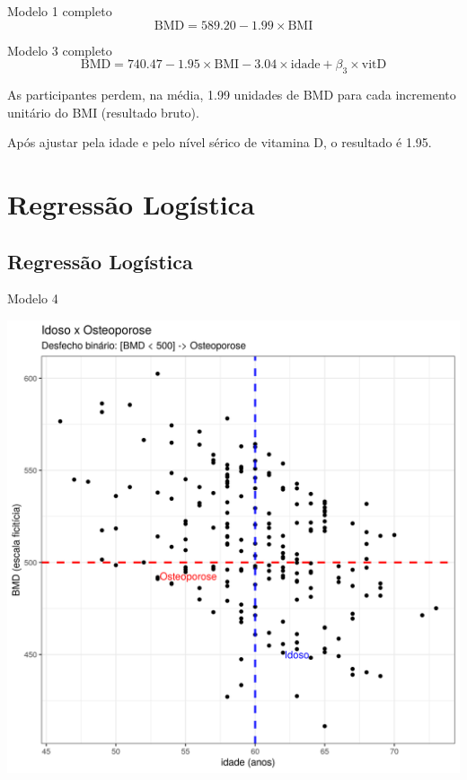 \documentclass{beamer}
\begin{document}
\begin{frame}{\scriptsize }
  \begin{exampleblock}{Modelo 1 completo}
    \tiny
    \begin{displaymath}
      \text{BMD} =589.20 -1.99 \times\text{BMI}
    \end{displaymath}
  \end{exampleblock}
  \begin{exampleblock}{Modelo 3 completo}
    \footnotesize
    \begin{displaymath}
      \text{BMD} =740.47 -1.95 \times\text{BMI} -3.04 \times\text{idade} + \beta_3 \times\text{vitD}
    \end{displaymath}
  \end{exampleblock}
  \begin{block}{}
    \footnotesize
    As participantes perdem, na média, 1.99 unidades de BMD para cada incremento unitário do BMI (resultado bruto).

    \bigskip
    Após ajustar pela idade e pelo nível sérico de vitamina D, o resultado é 1.95.
  \end{block}
\end{frame}

\section{Regressão Logística}

\subsection{Regressão Logística}

\begin{frame}{\scriptsize Modelo 4}
  \begin{center}
    \includegraphics[height=.9\textheight]{Cap31-32/pratica-glm4}
  \end{center}
\end{frame}
\end{document}
